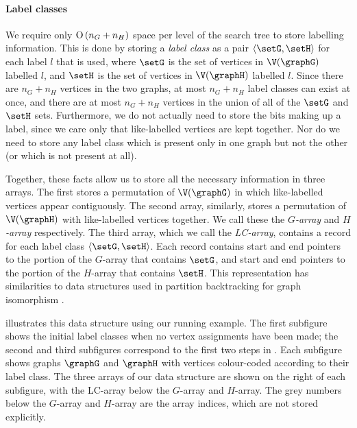 \paragraph{Label classes} We require only $\operatorname{O}\left(n_G+n_H\right)$ space per level of
the search tree to store labelling information.  This is done by storing a
\emph{label class} as a pair $\langle \setG,\setH \rangle$ for each label $l$
that is used, where $\setG$ is the set of vertices in $\V(\graphG)$ labelled
$l$, and $\setH$ is the set of vertices in $\V(\graphH)$ labelled $l$. Since
there are $n_G + n_H$ vertices in the two graphs, at most $n_G + n_H$ label
classes can exist at once, and there are at most $n_G + n_H$ vertices in the
union of all of the $\setG$ and $\setH$ sets. Furthermore, we do not actually
need to store the bits making up a label, since we care only that like-labelled
vertices are kept together. Nor do we need to store any label class which is
present only in one graph but not the other (or which is not present at all).

Together, these facts allow us to store all the
necessary information in three arrays.  The first 
stores a permutation of $\V(\graphG)$ in which like-labelled vertices appear
contiguously.  The second array, similarly, stores a permutation
of $\V(\graphH)$ with like-labelled vertices together.  We call these
the \emph{$G$-array} and \emph{$H$-array} respectively. The third array,
which we call the \emph{LC-array},
contains a record for each label class $\langle \setG,\setH \rangle$.  Each
record contains start and end pointers to the portion of the
$G$-array that contains $\setG$, and start and end pointers to the portion
of the $H$-array that contains $\setH$.
This representation has
similarities to data structures used in partition backtracking for graph isomorphism
\citep{DBLP:journals/jsc/McKayP14,DBLP:conf/wea/Lopez-PresaA09}.

 illustrates this data structure using our running example.
The first subfigure shows the initial label classes when no vertex assignments have
been made; the second and third subfigures correspond to the first two steps in .
Each subfigure shows graphs $\graphG$ and $\graphH$ with vertices colour-coded according
to their label class.  The three arrays of our data structure are shown on the right of each subfigure,
with the LC-array below the $G$-array and $H$-array.  The grey numbers below the $G$-array and $H$-array
are the array indices, which are not stored explicitly.

